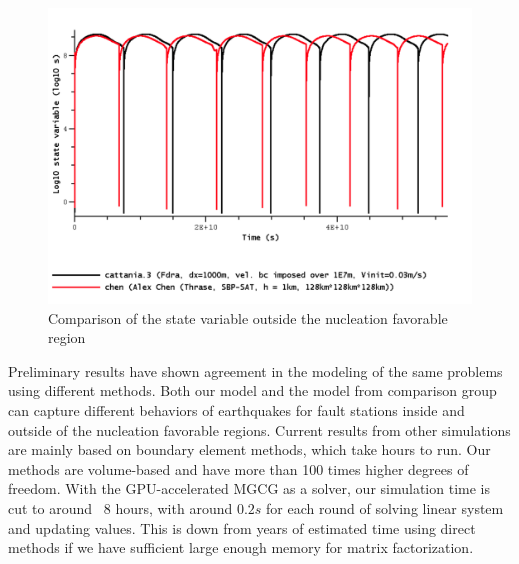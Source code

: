 \begin{figure}
    \centering
    \includegraphics[width=\linewidth]{figures/state-variable-outside-nucleation.png}
    \caption{Comparison of the state variable outside the nucleation favorable region}
    \label{fig:state-outside}
\end{figure}



Preliminary results have shown agreement in the modeling of the same problems using different methods.
Both our model and the model from comparison group can capture different behaviors of earthquakes for fault stations inside and outside of the nucleation favorable regions.
Current results from other simulations are mainly based on boundary element methods, which take hours to run.
Our methods are volume-based and have more than 100 times higher degrees of freedom.
With the GPU-accelerated MGCG as a solver, our simulation time is cut to around ~8 hours, with around $0.2s$ for each round of solving linear system and updating values. 
This is down from years of estimated time using direct methods if we have sufficient large enough memory for matrix factorization.